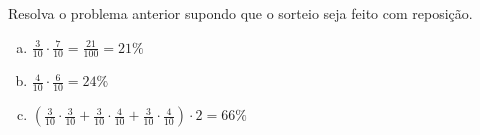 \begin{ex}
Resolva o problema anterior supondo que o sorteio seja feito com reposição.
  \begin{sol}
   \phantom{A}
     \begin{enumerate} [(a)]
         \item $\frac{3}{10}\cdot\frac{7}{10}=\frac{21}{100}=21\%$
         \item $\frac{4}{10}\cdot\frac{6}{10}=24\%$
         \item $(\frac{3}{10}\cdot\frac{3}{10}+\frac{3}{10}\cdot\frac{4}{10}+\frac{3}{10}\cdot\frac{4}{10})\cdot2=66\%$
     \end{enumerate}
  \end{sol}
\end{ex}